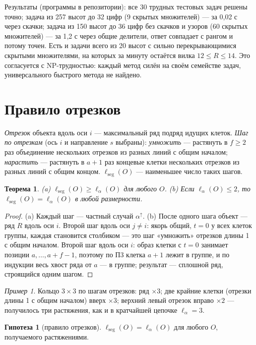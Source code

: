 \documentclass[11pt,a4paper]{article}
\theoremstyle{plain}
\newtheorem{theorem}{Теорема}[section]
\theoremstyle{definition}
\newtheorem{conjecture}{Гипотеза}
\theoremstyle{remark}
\newtheorem*{example}{Пример}
\newcommand{\lseg}{\ell_{\mathrm{seg}}}
\begin{document}
Результаты (программы в репозитории): все 30 трудных тестовых задач решены точно; задача из 257 высот до 32 цифр (9 скрытых множителей) — за 0{,}02 с через скачки; задача из 150 высот до 36 цифр без скачков и узоров (60 скрытых множителей) — за 1{,}2 с через общие делители, ответ совпадает с рангом и потому точен. Есть и задачи всего из 20 высот с сильно перекрывающимися скрытыми множителями, на которых за минуту остаётся вилка $12\le R\le14$. Это согласуется с NP-трудностью: каждый метод силён на своём семействе задач, универсального быстрого метода не найдено.

\section{Правило отрезков}\label{sec:seg}

\emph{Отрезок} объекта вдоль оси $i$ — максимальный ряд подряд идущих клеток. \emph{Шаг по отрезкам} (ось $i$ и направление $s$ выбраны): \emph{умножить} — растянуть в $f\ge2$ раз объединение нескольких отрезков из разных линий с общим началом; \emph{нарастить} — растянуть в $a+1$ раз концевые клетки нескольких отрезков из разных линий с общим концом. $\lseg(O)$ — наименьшее число таких шагов.

\begin{theorem}\label{thm:seg}
(a) $\lseg(O)\ge\ell_\alpha(O)$ для любого $O$. (b) Если $\ell_\alpha(O)\le2$, то $\lseg(O)=\ell_\alpha(O)$ в любой размерности.
\end{theorem}
\begin{proof}
(a) Каждый шаг — частный случай $\alpha^\uparrow$. (b) После одного шага объект — ряд $R$ вдоль оси $i$. Второй шаг вдоль оси $j\ne i$: якорь общий, $t=0$ у всех клеток группы, каждая становится столбиком — это шаг «умножить» отрезков длины 1 с общим началом. Второй шаг вдоль оси $i$: образ клетки с $t=0$ занимает позиции $a,\dots,a+f-1$, поэтому по П3 клетка $a+1$ лежит в группе, и по индукции весь хвост ряда от $a$ — в группе; результат — сплошной ряд, строящийся одним шагом.
\end{proof}

\begin{example}
Кольцо $3\times3$ по шагам отрезков: ряд $\times3$; две крайние клетки (отрезки длины 1 с общим началом) вверх $\times3$; верхний левый отрезок вправо $\times2$ — получилось три растяжения, как и в кратчайшей цепочке $\ell_\alpha=3$.
\end{example}

\begin{conjecture}[правило отрезков]\label{conj:seg}
$\lseg(O)=\ell_\alpha(O)$ для любого $O$, получаемого растяжениями.
\end{conjecture}
\end{document}
